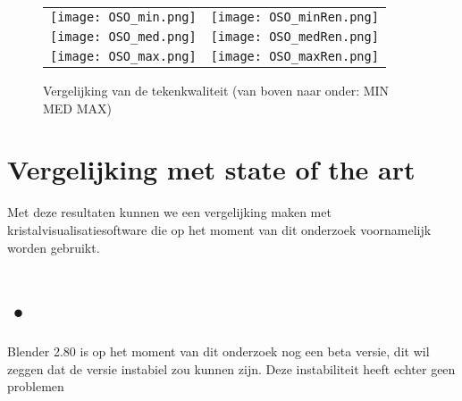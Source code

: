\begin{figure}[H]
\begin{center}
\begin{tabular}{l|l}

\texttt{[image: OSO\_min.png]}
&
\texttt{[image: OSO\_minRen.png]}
\\ 
\texttt{[image: OSO\_med.png]}
&
\texttt{[image: OSO\_medRen.png]}
\\ 
\texttt{[image: OSO\_max.png]}
&
\texttt{[image: OSO\_maxRen.png]}
\end{tabular}
\end{center}
\caption{Vergelijking van de tekenkwaliteit (van boven naar onder: MIN MED MAX)}
\end{figure}



\section{Vergelijking met state of the art}  
Met deze resultaten kunnen we een vergelijking maken met kristalvisualisatiesoftware die op het moment van dit onderzoek voornamelijk worden gebruikt.




 

	


\section{•}

Blender 2.80 is op het moment van dit onderzoek nog een beta versie, dit wil zeggen dat de versie instabiel zou kunnen zijn. Deze instabiliteit heeft echter geen problemen 
   